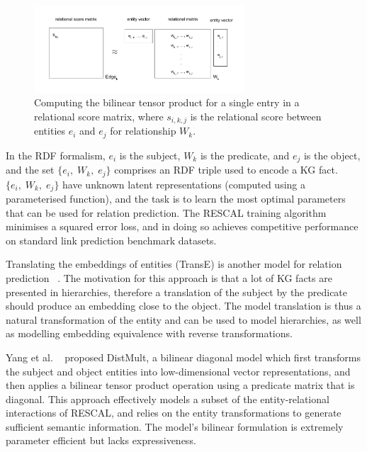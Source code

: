 \begin{figure}
   	\centering
    	\includegraphics[width=0.7\textwidth, height=0.3\textwidth]{bilinear_tensor_product}
	\captionsetup{justification=centering}
	\caption{Computing the bilinear tensor product for a single entry in a relational score matrix, where $ s_{i,k,j} $ is the relational score between entities $ e_i $ and $ e_j$ for relationship $ W_k $. }
\end{figure}

\noindent In the RDF formalism, $ e_i $ is the subject, $ W_k $ is the predicate, and $ e_j $ is the object, and the set $ \{ e_i, \; W_k, \; e_j \} $ comprises an RDF triple used to encode a KG fact.\ $ \{ e_i, \; W_k, \; e_j \} $ have unknown latent representations (computed using a parameterised function), and the task is to learn the most optimal parameters that can be used for relation prediction. The RESCAL training algorithm minimises a squared error loss, and in doing so achieves competitive performance on standard link prediction benchmark datasets. \par

\noindent Translating the embeddings of entities (TransE) is another model for relation prediction \unskip~\citep{bordes2013translating}. The motivation for this approach is that a lot of KG facts are presented in hierarchies, therefore a translation of the subject by the predicate should produce an embedding close to the object. The model translation is thus a natural transformation of the entity and can be used to model hierarchies, as well as modelling embedding equivalence with reverse transformations. \par

\noindent Yang et al. \unskip~\citep{yang2014embedding} proposed DistMult, a bilinear diagonal model which first transforms the subject and object entities into low-dimensional vector representations, and then applies a bilinear tensor product operation using a predicate matrix that is diagonal. This approach effectively models a subset of the entity-relational interactions of RESCAL, and relies on the entity transformations to generate sufficient semantic information. The model's bilinear formulation is extremely parameter efficient but lacks expressiveness. \par

